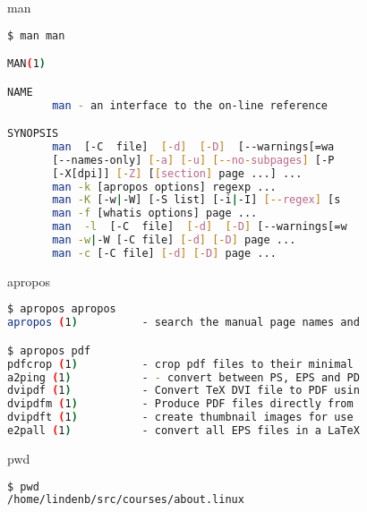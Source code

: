 \documentclass{beamer}
\begin{document}
\begin{frame}[fragile]
 \begin{center}
    \huge{man}\\
    \end{center}
\begin{lstlisting}[language=bash]
$ man man

MAN(1)                                                               

NAME
       man - an interface to the on-line reference

SYNOPSIS
       man  [-C  file]  [-d]  [-D]  [--warnings[=wa
       [--names-only] [-a] [-u] [--no-subpages] [-P 
       [-X[dpi]] [-Z] [[section] page ...] ...
       man -k [apropos options] regexp ...
       man -K [-w|-W] [-S list] [-i|-I] [--regex] [s
       man -f [whatis options] page ...
       man  -l  [-C  file]  [-d]  [-D] [--warnings[=w
       man -w|-W [-C file] [-d] [-D] page ...
       man -c [-C file] [-d] [-D] page ...

\end{lstlisting}
\end{frame}


\begin{frame}[fragile]
 \begin{center}
    \huge{apropos}\\
    \end{center}
\begin{lstlisting}[language=bash]
$ apropos apropos
apropos (1)          - search the manual page names and 

$ apropos pdf
pdfcrop (1)          - crop pdf files to their minimal 
a2ping (1)           - - convert between PS, EPS and PD
dvipdf (1)           - Convert TeX DVI file to PDF usin
dvipdfm (1)          - Produce PDF files directly from
dvipdft (1)          - create thumbnail images for use 
e2pall (1)           - convert all EPS files in a LaTeX
\end{lstlisting}
\end{frame}

\begin{frame}[fragile]
 \begin{center}
    \huge{pwd}\\
    \end{center}
\begin{lstlisting}[language=bash]
$ pwd
/home/lindenb/src/courses/about.linux
\end{lstlisting}
\end{frame}
\end{document}

